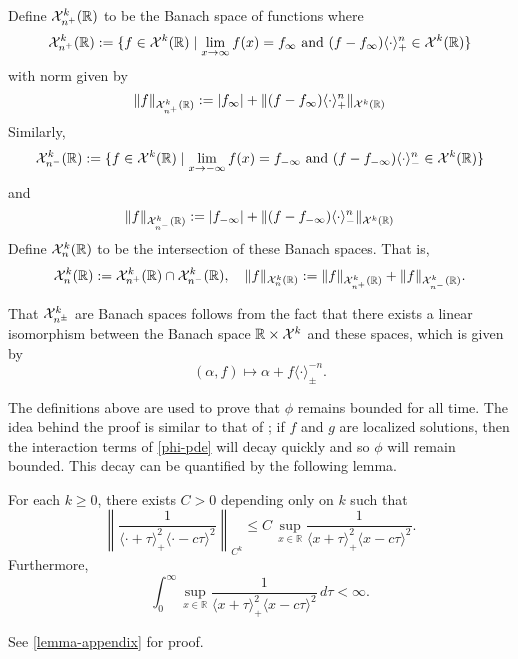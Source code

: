 \begin{defn}
	Define \(\mathcal{X}^k_{n^+} (\mathbb{R})\) to be the Banach space of functions where 
	\begin{equation}
		\mathcal{X}^k_{n^+} (\mathbb{R}) := \{ f \in \mathcal{X}^k(\mathbb{R}) \mid \lim_{x\to\infty} f(x) = f_\infty\text{ and } (f-f_\infty)\langle\cdot\rangle_+^n \in \mathcal{X}^k(\mathbb{R})\}
	\end{equation}
	with norm given by
	\begin{equation}
		\| f \|_{\mathcal{X}^k_{n^+}(\mathbb{R})} := |f_\infty| + \|(f-f_\infty) \langle \cdot \rangle_+^n \|_{\mathcal X^k(\mathbb{R})}
	\end{equation}
	Similarly, 
	\begin{equation}
		\mathcal{X}^k_{n^-} (\mathbb{R}) := \{ f \in \mathcal{X}^k(\mathbb{R}) \mid \lim_{x\to-\infty} f(x) = f_{-\infty}\text{ and } (f-f_{-\infty})\langle\cdot\rangle_-^n \in \mathcal{X}^k(\mathbb{R})\}
	\end{equation}
	and 
	\begin{equation}
		\| f \|_{\mathcal{X}^k_{n^-}(\mathbb{R})} := |f_{-\infty}| + \|(f-f_{-\infty}) \langle \cdot \rangle_-^n \|_{\mathcal X^k(\mathbb{R})}
	\end{equation}
	Define \(\mathcal{X}^k_n(\mathbb{R})\) to be the intersection of these Banach spaces. That is,
	\begin{equation}
		\mathcal{X}^k_n(\mathbb{R}) := \mathcal{X}^k_{n^+} (\mathbb{R}) \cap \mathcal{X}^k_{n^-} (\mathbb{R}), \quad \| f \|_{\mathcal{X}^k_{n} (\mathbb{R})} := \|f\|_{\mathcal{X}^k_{n^+} (\mathbb{R})} + \|f\|_{\mathcal{X}^k_{n^-} (\mathbb{R})}.
	\end{equation}
\end{defn}
	That \(\mathcal{X}^k_{n^\pm}\) are Banach spaces follows from the fact that there exists a linear isomorphism between the Banach space \(\mathbb{R}\times \mathcal{X}^k\) and these spaces, which is given by
\begin{equation}
	(\alpha, f) \mapsto \alpha + f \langle \cdot \rangle^{-n}_{\pm}.
\end{equation}

The definitions above are used to prove that \(\phi\) remains bounded for all time. The idea behind the proof is similar to that of \cite[Lemma~3.1]{schneider2000counter}; if \(f\) and \(g\) are localized solutions, then the interaction terms of \cref{phi-pde} will decay quickly and so \(\phi\) will remain bounded. This decay can be quantified by the following lemma.
\begin{lem}
	For each \(k\geq 0\), there exists \(C> 0\) depending only on \(k\) such that 
	\begin{equation}\label{Ck-bound}
		\left \| \frac 1 {\langle \cdot +\tau\rangle_+^2 \langle \cdot - c\tau \rangle^2} \right \|_{C^k} \leq C\, \sup_{x\in\mathbb R} \frac 1 {\langle x +\tau\rangle_+^2 \langle x -c \tau \rangle^2}.
	\end{equation}
	Furthermore,
	\begin{equation}
		\int_0^\infty \sup_{x\in\mathbb R} \frac 1 {\langle x +\tau\rangle_+^2 \langle x -c \tau \rangle^2}\, d\tau <\infty.
	\end{equation}
\end{lem}
See \cref{lemma-appendix} for proof. 

